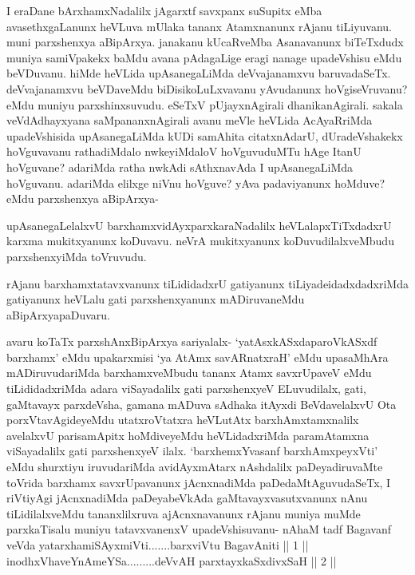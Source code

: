 \begin{artha}
I eraDane bArxhamxNadalilx jAgarxtf savxpanx suSupitx eMba avasethxgaLanunx heVLuva mUlaka tananx Atamxnanunx rAjanu tiLiyuvanu. muni parxshenxya aBipArxya. janakanu kUcaRveMba Asanavanunx biTeTxdudx muniya samiVpakekx baMdu avana pAdagaLige eragi nanage upadeVshisu eMdu beVDuvanu. hiMde heVLida upAsanegaLiMda deVvajanamxvu baruvadaSeTx. deVvajanamxvu beVDaveMdu biDisikoLuLxvavanu yAvudanunx hoVgiseVruvanu? eMdu muniyu parxshinxsuvudu. eSeTxV pUjayxnAgirali dhanikanAgirali. sakala veVdAdhayxyana saMpananxnAgirali avanu meVle heVLida AcAyaRriMda upadeVshisida upAsanegaLiMda kUDi samAhita citatxnAdarU, dUradeVshakekx hoVguvavanu rathadiMdalo nwkeyiMdaloV hoVguvuduMTu hAge ItanU hoVguvane? adariMda ratha nwkAdi sAthxnavAda I upAsanegaLiMda hoVguvanu. adariMda elilxge niVnu hoVguve? yAva padaviyanunx hoMduve? eMdu parxshenxya aBipArxya-
\end{artha}%

\begin{artha}
upAsanegaLelalxvU barxhamxvidAyxparxkaraNadalilx heVLalapxTiTxdadxrU karxma mukitxyanunx koDuvavu. neVrA mukitxyanunx koDuvudilalxveMbudu parxshenxyiMda toVruvudu. 
\end{artha}


\begin{artha}
rAjanu barxhamxtatavxvanunx tiLididadxrU gatiyanunx tiLiyade\break idadxdadxriMda gatiyanunx heVLalu gati parxshenxyanunx mADiruvaneMdu aBipArxyapaDuvaru. 
\end{artha}

\begin{artha}
avaru koTaTx parxshAnxBipArxya sariyalalx- `yatAsxkASxdaparoVkASxdf barxhamx' eMdu upakarxmisi `ya AtAmx savARnatxraH' eMdu upasaMhAra mADiruvudariMda barxhamxveMbudu tananx Atamx savxrUpaveV eMdu tiLididadxriMda adara viSayadalilx gati parxshenxyeV ELuvudilalx, gati, gaMtavayx parxdeVsha, gamana mADuva sAdhaka itAyxdi BeVdavelalxvU Ota porxVtavAgideyeMdu utatxroVtatxra heVLutAtx barxhAmxtamxnalilx avelalxvU parisamApitx hoMdiveyeMdu heVLidadxriMda paramAtamxna viSayadalilx gati parxshenxyeV ilalx. `barxhemxYvasanf barxhAmxpeyxVti' eMdu shurxtiyu iruvudariMda avidAyxmAtarx nAshdalilx paDeyadiruvaMte toVrida barxhamx savxrUpavanunx jAcnxnadiMda paDedaMtAguvudaSeTx, I riVtiyAgi jAcnxnadiMda paDeyabeVkAda gaMtavayxvasutxvanunx nAnu tiLidilalxveMdu tananxlilxruva ajAcnxnavanunx rAjanu muniya muMde parxkaTisalu muniyu tatavxvanenxV upadeVshisuvanu-
nAhaM tadf Bagavanf veVda yatarxhamiSAyxmiVti.......barxviVtu BagavAniti || 1 || \\
inodhxVhaveYnAmeYSa.........deVvAH parxtayxkaSxdivxSaH || 2 ||
\end{artha}

